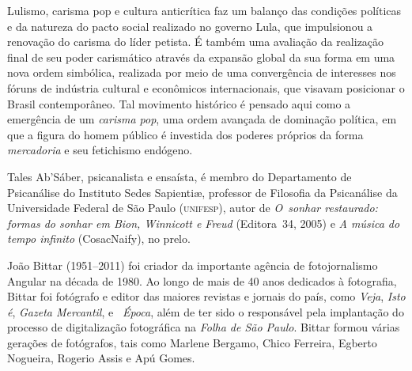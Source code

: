 \begin{resumopage}

\item[Lulismo, carisma pop e cultura anticrítica]
faz um balanço das condições políticas e da natureza do pacto social realizado no
governo Lula, que impulsionou a renovação do carisma do líder petista. É também
uma avaliação da realização final de seu poder carismático através da expansão
global da sua forma em uma nova ordem simbólica, realizada por meio de uma
convergência de interesses nos fóruns de indústria cultural e econômicos
internacionais, que visavam posicionar o Brasil contemporâneo. Tal movimento
histórico é pensado aqui como a emergência de um \textit{carisma pop}, uma ordem
avançada de dominação política, em que a figura do homem público é investida
dos poderes próprios da forma \textit{mercadoria} e seu fetichismo endógeno.

\item[Tales Ab’Sáber,] psicanalista e ensaísta, é membro do Departamento de Psicanálise 
do Instituto Sedes Sapienti\ae{}, professor de Filosofia da Psicanálise da Universidade Federal 
de São Paulo (\textsc{unifesp}), autor de \textit{O~sonhar
restaurado: formas do sonhar em Bion, Winnicott e Freud} (Editora~34, 2005) e
\textit{A música do tempo infinito} (CosacNaify), no prelo. 

\item[João Bittar] (1951--2011) foi criador da importante agência de fotojornalismo Angular 
na década de 1980. Ao longo de mais de 40 anos dedicados à fotografia, Bittar foi fotógrafo e 
editor das maiores revistas e jornais do país, como \textit{Veja}, \textit{Isto é}, \textit{Gazeta Mercantil}, 
e  \textit{Época}, além de ter sido o responsável pela implantação do processo de digitalização fotográfica 
na \textit{Folha de São Paulo}. Bittar formou várias gerações de fotógrafos, tais como Marlene Bergamo, 
Chico Ferreira, Egberto Nogueira, Rogerio Assis e Apú Gomes.
\end{resumopage}


